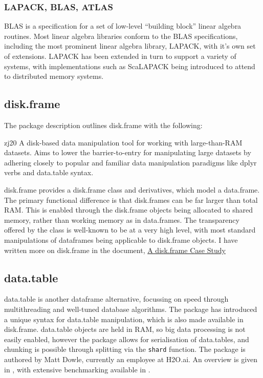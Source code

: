 \documentclass[a4paper,10pt]{article}
\begin{document}
\subsubsection{LAPACK, BLAS, ATLAS}
\label{sec:blas-lapack}

BLAS is a specification for a set of low-level ``building block''
linear algebra routines\cite{lawson1979basic}. Most linear algebra
libraries conform to the BLAS specifications, including the most
prominent linear algebra library, LAPACK, with it's own set of
extensions\cite{demmel1989lapack}. LAPACK has been extended in turn to
support a variety of systems, with implementations such as ScaLAPACK
being introduced to attend to distributed memory
systems\cite{choi1992scalapack}.

\subsection{disk.frame}
\label{sec:disk.frame}

The package description outlines disk.frame with the following:

\begin{displaycquote}{zj20}
	A disk-based data manipulation tool for working with large-than-RAM
	datasets. Aims to lower the barrier-to-entry for manipulating large
	datasets by adhering closely to popular and familiar data
	manipulation paradigms like dplyr verbs and data.table syntax.
\end{displaycquote}

disk.frame provides a disk.frame class and derivatives, which model a
data.frame. The primary functional difference is that disk.frames can
be far larger than total RAM. This is enabled through the disk.frame
objects being allocated to shared memory, rather than working memory
as in data.frames. The transparency offered by the class is well-known
to be at a very high level, with most standard manipulations of
dataframes being applicable to disk.frame objects. I have written more
on disk.frame in the document, \href{case-study-disk.frame.pdf}{A
	disk.frame Case Study}

\subsection{data.table}
\label{sec:data.table}

data.table is another dataframe alternative, focussing on speed
through multithreading and well-tuned database
algorithms\cite{dowle19}. The package has introduced a unique syntax
for data.table manipulation, which is also made available in
disk.frame. data.table objects are held in RAM, so big data processing
is not easily enabled, however the package allows for serialisation of
data.tables, and chunking is possible through splitting via the
\texttt{shard} function. The package is authored by Matt Dowle,
currently an employee at H2O.ai. An overview is given in
\textcite{dowle19:_introd}, with extensive benchmarking available in
\textcite{dowle19:_bench}.
\end{document}
